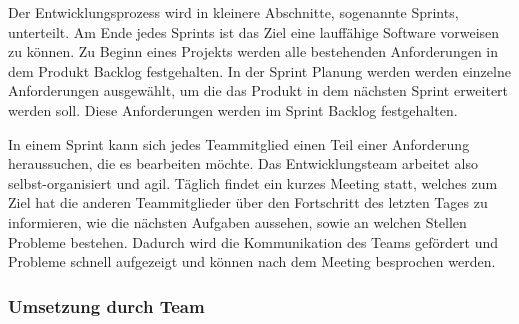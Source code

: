 Der Entwicklungsprozess wird in kleinere Abschnitte, sogenannte Sprints, unterteilt. Am Ende jedes Sprints ist das Ziel eine lauffähige Software vorweisen zu können. Zu Beginn eines Projekts werden alle bestehenden Anforderungen in dem Produkt Backlog festgehalten. In der Sprint Planung werden werden einzelne Anforderungen ausgewählt, um die das Produkt in dem nächsten Sprint erweitert werden soll. Diese Anforderungen werden im Sprint Backlog festgehalten. 

In einem Sprint kann sich jedes Teammitglied einen Teil einer Anforderung heraussuchen, die es bearbeiten möchte. Das Entwicklungsteam arbeitet also selbst-organisiert und agil. Täglich findet ein kurzes Meeting statt, welches zum Ziel hat die anderen Teammitglieder über den Fortschritt des letzten Tages zu informieren, wie die nächsten Aufgaben aussehen, sowie an welchen Stellen Probleme bestehen. Dadurch wird die Kommunikation des Teams gefördert und Probleme schnell aufgezeigt und können nach dem Meeting besprochen werden. 

\subsubsection{Umsetzung durch Team}